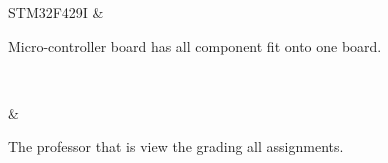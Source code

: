 
STM32F429I		&	\begin{minipage}{\GlossaryColumnWidth}{
Micro-controller board has all component fit onto one board.
}\end{minipage}\\ \hline

\Customer       &	\begin{minipage}{\GlossaryColumnWidth}{
The professor that is view the grading all assignments.
}\end{minipage}\\ \hline


